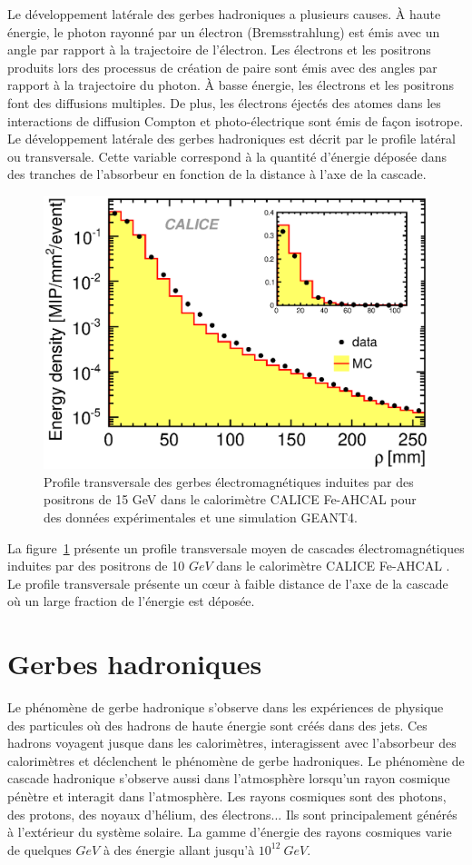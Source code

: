 Le développement latérale des gerbes hadroniques a plusieurs causes. À haute énergie, le photon rayonné par un électron (Bremsstrahlung) est émis avec un angle par rapport à la trajectoire de l'électron. Les électrons et les positrons produits lors des processus de création de paire sont émis avec des angles par rapport à la trajectoire du photon. À basse énergie, les électrons et les positrons font des diffusions multiples. De plus, les électrons éjectés des atomes dans les interactions de diffusion Compton et photo-électrique sont émis de façon isotrope. Le développement latérale des gerbes hadroniques est décrit par le profile latéral ou transversale. Cette variable correspond à la quantité d'énergie déposée dans des tranches de l'absorbeur en fonction de la distance à l'axe de la cascade. 
\begin{figure}[!h]
  \begin{center}
    \includegraphics[width=.5\textwidth]{ShowerTh/figs/transverseProfile_15gev_1cm.eps}
    \caption{Profile transversale des gerbes électromagnétiques induites par des positrons de 15 GeV dans le calorimètre CALICE Fe-AHCAL pour des données expérimentales et une simulation GEANT4.}
    \label{fig:tProfile_e-}
  \end{center}
\end{figure}
La figure~\ref{fig:tProfile_e-} présente un profile transversale moyen de cascades électromagnétiques induites par des positrons de 10 $GeV$ dans le calorimètre CALICE Fe-AHCAL \cite{1748-0221-6-04-P04003}. Le profile transversale présente un cœur à faible distance de l'axe de la cascade où un large fraction de l'énergie est déposée. 

\section{Gerbes hadroniques}
\label{sec.hadron_shower}
Le phénomène de gerbe hadronique s'observe dans les expériences de physique des particules où des hadrons de haute énergie sont créés dans des jets. Ces hadrons voyagent jusque dans les calorimètres, interagissent avec l'absorbeur des calorimètres et déclenchent le phénomène de gerbe hadroniques. Le phénomène de cascade hadronique s'observe aussi dans l’atmosphère lorsqu'un rayon cosmique pénètre et interagit dans l'atmosphère. Les rayons cosmiques sont des photons, des protons, des noyaux d'hélium, des électrons... Ils sont principalement générés à l'extérieur du système solaire. La gamme d'énergie des rayons cosmiques varie de quelques $GeV$ à des énergie allant jusqu'à $10^{12}\ GeV$. 
